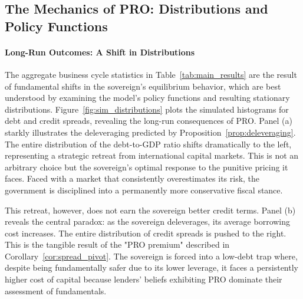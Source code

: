 \documentclass[12pt]{article}
\theoremstyle{plain}
\begin{document}
\subsection{The Mechanics of PRO: Distributions and Policy Functions}

\paragraph{Long-Run Outcomes: A Shift in Distributions}
The aggregate business cycle statistics in Table~\ref{tab:main_results} are the
result of fundamental shifts in the sovereign's equilibrium behavior, which are
best understood by examining the model's policy functions and resulting
stationary distributions. Figure~\ref{fig:sim_distributions} plots the
simulated histograms for debt and credit spreads, revealing the long-run
consequences of PRO. Panel (a) starkly illustrates the deleveraging predicted
by Proposition~\ref{prop:deleveraging}. The entire distribution of the
debt-to-GDP ratio shifts dramatically to the left, representing a strategic
retreat from international capital markets. This is not an arbitrary choice but
the sovereign's optimal response to the punitive pricing it faces. Faced with a
market that consistently overestimates its risk, the government is disciplined
into a permanently more conservative fiscal stance.

This retreat, however, does not earn the sovereign better credit terms. Panel
(b) reveals the central paradox: as the sovereign deleverages, its average
borrowing cost increases. The entire distribution of credit spreads is pushed
to the right. This is the tangible result of the "PRO premium" described in
Corollary~\ref{cor:spread_pivot}. The sovereign is forced into a low-debt trap
where, despite being fundamentally safer due to its lower leverage, it faces a
persistently higher cost of capital because lenders' beliefs exhibiting PRO
dominate their assessment of fundamentals.
\end{document}
